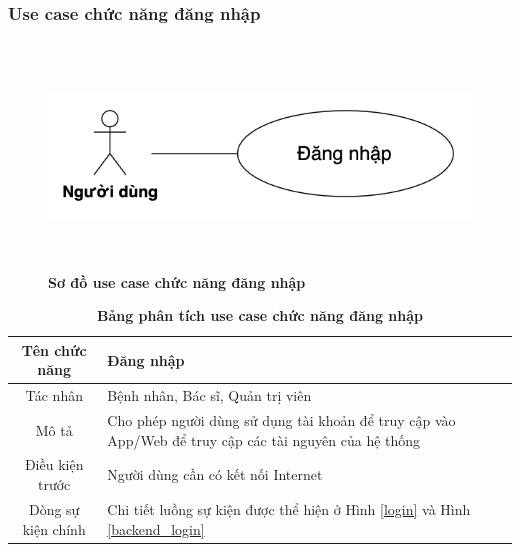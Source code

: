 \subsubsection{Use case chức năng đăng nhập}
  \begin{figure}[H]
    \centering
    \includegraphics[width=15cm,height=6cm]{Images/use_case/use_case_login.png}
    \caption[Sơ đồ use case chức năng đăng nhập]{\bfseries \fontsize{12pt}{0pt}
    \selectfont Sơ đồ use case chức năng đăng nhập}
    \label{use_case_login} %
  \end{figure}

  \begin{table}[H]
    \caption{\bfseries \fontsize{12pt}{0pt}\selectfont Bảng phân tích use case chức năng đăng nhập}
    \centering
    \begin{tabularx}{0.9\textwidth}{|c|X|}
      \hline
      \textbf{Tên chức năng} & \textbf{Đăng nhập} \\
      \hline
      Tác nhân & Bệnh nhân, Bác sĩ, Quản trị viên \\
      \hline
      Mô tả & Cho phép người dùng sử dụng tài khoản để truy cập vào App/Web để truy cập các tài nguyên của hệ thống \\
      \hline
      Điều kiện trước & Người dùng cần có kết nối Internet \\
      \hline
      Dòng sự kiện chính & 
        Chi tiết luồng sự kiện được thể hiện ở Hình \ref{login} và Hình \ref{backend_login}\\
      \hline
    \end{tabularx}
  \end{table}

